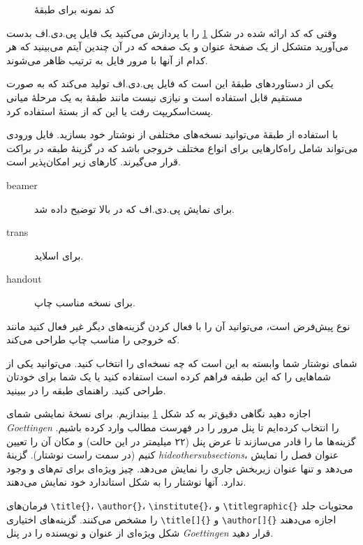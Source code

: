 {\begin{figure}[htbp]
\begin{verbatim}
\end{verbatim}
\setRL
  \caption{کد نمونه برای طبقهٔ  }
  \label{fig:code-beamer}
\end{figure}

وقتی که کد ارائه شده در شکل 
\ref{fig:code-beamer} 
را با  
 پردازش می‌کنید یک فایل پی.دی.اف بدست می‌آورید متشکل از یک صفحهٔ عنوان و یک صفحه که در آن چندین آیتم می‌بینید که هر کدام از آنها با مرور فایل به ترتیب ظاهر می‌شوند.

یکی از دستاوردهای طبقهٔ   این است که فایل پی.دی.اف تولید می‌کند که به صورت مستقیم قابل استفاده است و نیازی نیست مانند  طبقهٔ  به یک مرحلهٔ میانی پست‌اسکریپت رفت یا این که از بستهٔ   استفاده کرد.

با استفاده از طبقهٔ  می‌توانید نسخه‌های مختلفی از نوشتار‌ خود بسازید. فایل ورودی می‌تواند شامل راه‌کارهایی برای انواع مختلف خروجی باشد که در گزینهٔ طبقه در براکت قرار می‌گیرند. کارهای زیر امکان‌پذیر است.

\begin{description}
\item[beamer] برای نمایش پی.دی.اف که در بالا توضیح داده شد.
\item[trans] برای اسلاید.
\item[handout] برای نسخه مناسب چاپ.
\end{description}
نوع پیش‌فرض  است، می‌توانید آن را با فعال کردن گزینه‌های دیگر غیر فعال کنید مانند
 که خروجی را مناسب چاپ طراحی می‌کند.

شمای نوشتار‌ شما وابسته به این است که چه نسخه‌ای را انتخاب کنید. می‌توانید یکی از شماهایی را که این طبقه فراهم کرده است استفاده کنید یا یک شما برای خودتان طراحی کنید. راهنمای طبقه را در  ببینید.

اجازه دهید نگاهی دقیق‌تر به کد شکل 
\ref{fig:code-beamer} 
بیندازیم.
برای نسخهٔ نمایشی   شمای \emph{Goettingen} را انتخاب کرده‌ایم تا پنل مرور را در فهرست مطالب وارد کرده باشیم. گزینه‌ها ما را قادر می‌سازند تا عرض پنل 
 (۲۲ میلیمتر در این حالت) 
 و مکان آن را تعیین کنیم  (در سمت راست نوشتار‌). گزینهٔ 
 \emph{hideothersubsections}، عنوان فصل را نمایش می‌دهد و تنها عنوان زیربخش جاری را نمایش می‌دهد. چیز ویژه‌ای برای تم‌های    و  وجود ندارد. آنها نوشتار‌ را به شکل استاندارد خود نمایش می‌دهند.

فرمان‌های \verb|\title{}|، \verb|\author{}|، \verb|\institute{}|،
 و \verb|\titlegraphic{}| محتویات جلد را مشخص می‌کنند. گزینه‌های اختیاری  \verb|\title[]{}|  و \verb|\author[]{}|
اجازه می‌دهند شکل ویژه‌ای از عنوان و نویسنده را در پنل  
\emph{Goettingen} 
قرار دهید.

}
